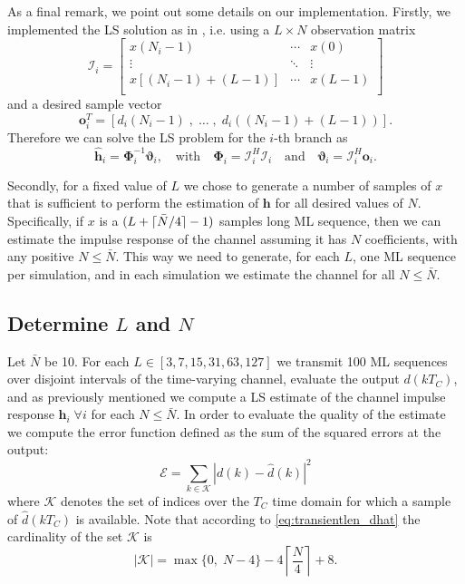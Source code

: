 \documentclass[10pt]{article}
\DeclarePairedDelimiter{\ceil}{\lceil}{\rceil}
\begin{document}
As a final remark, we point out some details on our implementation. Firstly, we implemented the LS solution as in \cite[p.~246]{bc}, i.e. using a $L \times N$ observation matrix
\begin{equation}
	\boldsymbol{\mathcal{I}}_i =
 \begin{bmatrix}
  x(N_i-1) & \cdots & x(0) \\
  \vdots  & \ddots & \vdots  \\
x[(N_i-1)+(L-1)] & \cdots & x(L-1) \\
 \end{bmatrix}
\end{equation}
and a desired sample vector
\begin{equation}
\mathbf{o}_i^T = \left[ d_i(N_i-1)\;,\; \ldots\; , \;d_i((N_i-1)+(L-1)) \right].
\end{equation}
Therefore we can solve the LS problem for the $i$-th branch as
\begin{equation}
	\hat{\mathbf{h}}_i = \mathbf{\Phi}_i^{-1} \boldsymbol{\vartheta}_i, \quad\mathrm{ with } \quad \mathbf{\Phi}_i=\boldsymbol{\mathcal{I}}_i^H \boldsymbol{\mathcal{I}}_i \quad \mathrm{ and }\quad \boldsymbol{\vartheta}_i = \boldsymbol{\mathcal{I}}_i^H \mathbf{o}_i.
\end{equation}

Secondly, for a fixed value of $L$ we chose to generate a number of samples of $x$ that is sufficient to perform the estimation of $\mathbf{h}$ for all desired values of $N$. Specifically, if $x$ is a $(L+\ceil{\bar{N}/4} - 1)$ samples long ML sequence, then we can estimate the impulse response of the channel assuming it has $N$ coefficients, with any positive $N \leq \bar{N}$. This way we need to generate, for each $L$, one ML sequence per simulation, and in each simulation we estimate the channel for all $N \leq \bar{N}$.


\subsection*{Determine $L$ and $N$}
Let $\bar{N}$ be 10. For each $L \in [3, 7, 15, 31, 63, 127]$ we transmit 100 ML sequences over disjoint intervals of the time-varying channel, evaluate the output $d(kT_C)$, and as previously mentioned we compute a LS estimate of the channel impulse response $\mathbf{h}_i \; \forall i$ for each $N \leq \bar{N}$. In order to evaluate the quality of the estimate we compute the error function defined as the sum of the squared errors at the output:
\begin{equation}
	\mathcal{E} = \sum_{k \in \mathcal{K}} |d(k)-\hat{d}(k)|^2
\end{equation}
where $\mathcal{K}$ denotes the set of indices over the $T_C$ time domain for which a sample of $\hat{d}(kT_C)$ is available. Note that according to \eqref{eq:transientlen_dhat} the cardinality of the set $\mathcal{K}$ is
\begin{equation}
|\mathcal{K}| = \max \{ 0, \; N-4 \} - 4 \left\lceil \frac{N}{4} \right\rceil + 8.
\end{equation}
\end{document}
